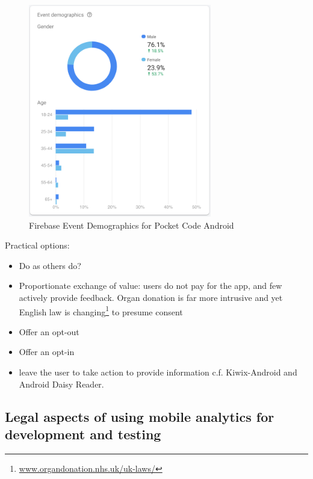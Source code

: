 \begin{figure}[htbp!]
    \centering
    \includegraphics[width=8cm]{images/firebase/Firebase-event-demographics-pocketcode-android.png}
    \caption{Firebase Event Demographics for Pocket Code Android}
    \label{fig:Firebase-event-demographics-pocketcode-android}
\end{figure}

Practical options:
\begin{itemize}
    \item Do as others do?
    \item Proportionate exchange of value: users do not pay for the app, and few actively provide feedback. Organ donation is far more intrusive and yet English law is changing\footnote{\href{https://www.organdonation.nhs.uk/uk-laws/}{www.organdonation.nhs.uk/uk-laws/}} to presume consent~\cite{NHS_organ_donation_in_england} 
    \item Offer an opt-out
    \item Offer an opt-in
    \item leave the user to take action to provide information c.f. Kiwix-Android and Android Daisy Reader.
\end{itemize}

\subsection{Legal aspects of using mobile analytics for development and testing}

